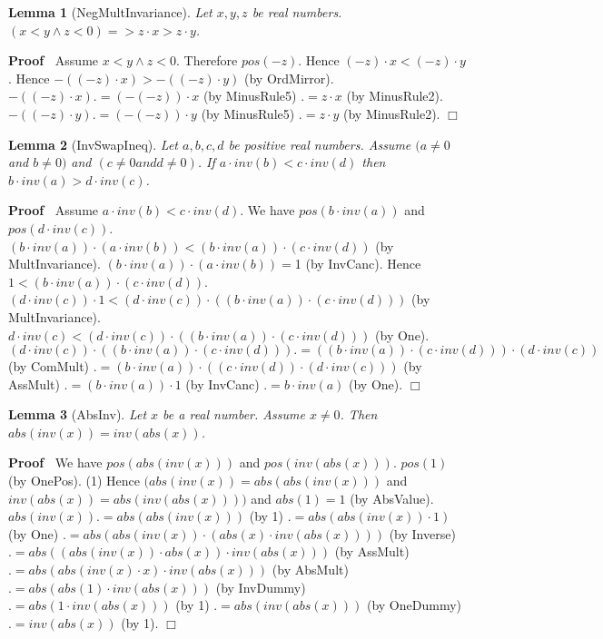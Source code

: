 \documentclass{article}
\newenvironment{forthel}{\begin{leftbar}}{\end{leftbar}}
\newenvironment{proof}{\noindent\textbf{Proof\ }}{\hspace*{\fill}$\Box$\medskip}
\newtheorem{lemma}{Lemma}
\begin{document}
\begin{forthel}
	
	\begin{lemma} [NegMultInvariance]
	Let $x, y, z$ be real numbers.
	$(x < y \wedge z < 0) => z \cdot x > z \cdot y$.
	\end{lemma}
	\begin{proof}
	Assume $x < y \wedge z < 0$.
	Therefore $pos(-z)$.    
	Hence $(-z) \cdot x < (-z) \cdot y$.
	Hence $-((-z) \cdot x) > -((-z) \cdot y)$ (by OrdMirror).
	$-((-z) \cdot x) .= (-(-z)) \cdot x$ (by MinusRule5)
	$.= z \cdot x$ (by MinusRule2).
	$-((-z) \cdot y) .= (-(-z)) \cdot y$ (by MinusRule5)
	$.= z \cdot y$ (by MinusRule2).
	\end{proof}
	
	
	\begin{lemma} [InvSwapIneq]
	Let $a, b, c, d$ be positive real numbers. Assume $(a \neq 0$ and $b \neq 0)$ and $(c \neq 0 and d \neq 0)$. 
	If $a \cdot inv(b) < c \cdot inv(d)$ then $b \cdot inv(a) > d \cdot inv(c)$.
	\end{lemma}
	\begin{proof}
	Assume $a \cdot inv(b) < c \cdot inv(d)$.
	We have $pos(b \cdot inv(a))$ and $pos(d \cdot inv(c))$.
	$(b \cdot inv(a)) \cdot (a \cdot inv(b)) < (b \cdot inv(a)) \cdot (c \cdot inv(d))$ (by MultInvariance).
	$(b \cdot inv(a)) \cdot (a \cdot inv(b)) = $1 (by InvCanc).
	Hence $1 < (b \cdot inv(a)) \cdot (c \cdot inv(d))$.
	$(d \cdot inv(c)) \cdot 1 < (d \cdot inv(c)) \cdot ((b \cdot inv(a)) \cdot (c \cdot inv(d)))$ (by MultInvariance).
	$d \cdot inv(c) < (d \cdot inv(c)) \cdot ((b \cdot inv(a)) \cdot (c \cdot inv(d)))$ (by One).
	$(d \cdot inv(c)) \cdot ((b \cdot inv(a)) \cdot (c \cdot inv(d))) .= ((b \cdot inv(a)) \cdot (c \cdot inv(d))) \cdot (d \cdot inv(c))$ (by ComMult)
	$.= (b \cdot inv(a)) \cdot ((c \cdot inv(d)) \cdot (d \cdot inv(c)))$ (by AssMult)
	$.= (b \cdot inv(a)) \cdot 1$ (by InvCanc)
	$.= b \cdot inv(a)$ (by One).   
	\end{proof}
	
	
	
	\begin{lemma} [AbsInv]
	Let $x$ be a real number. Assume $x \neq 0$. Then $abs(inv(x)) = inv(abs(x))$.
	\end{lemma}
	\begin{proof}
	We have $pos(abs(inv(x)))$ and $pos(inv(abs(x)))$.
	$pos(1)$ (by OnePos).
	(1) Hence $( abs(inv(x)) = abs(abs(inv(x)))$ and $inv(abs(x)) = abs(inv(abs(x))) )$ and $abs(1) = 1$ (by AbsValue).
	$abs(inv(x)) .= abs(abs(inv(x)))$ (by 1)
	$.= abs(abs(inv(x)) \cdot 1)$ (by One)
	$.= abs(abs(inv(x)) \cdot (abs(x) \cdot inv(abs(x))))$ (by Inverse)
	$.= abs((abs(inv(x)) \cdot abs(x)) \cdot inv(abs(x)))$ (by AssMult)
	$.= abs(abs(inv(x) \cdot x) \cdot inv(abs(x)))$ (by AbsMult)
	$.= abs(abs(1) \cdot inv(abs(x)))$ (by InvDummy)
	$.= abs(1 \cdot inv(abs(x)))$ (by 1) 
	$.= abs(inv(abs(x)))$ (by OneDummy)
	$.= inv(abs(x))$ (by 1).    
	\end{proof}
	

\end{forthel}
\end{document}
